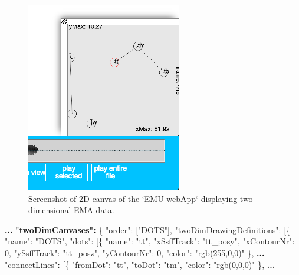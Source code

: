 \documentclass[]{book}
\newenvironment{Shaded}{\begin{snugshade}}{\end{snugshade}}
\newcommand{\DataTypeTok}[1]{\textcolor[rgb]{0.13,0.29,0.53}{#1}}
\newcommand{\DecValTok}[1]{\textcolor[rgb]{0.00,0.00,0.81}{#1}}
\newcommand{\ErrorTok}[1]{\textcolor[rgb]{0.64,0.00,0.00}{\textbf{#1}}}
\newcommand{\FunctionTok}[1]{\textcolor[rgb]{0.00,0.00,0.00}{#1}}
\newcommand{\OtherTok}[1]{\textcolor[rgb]{0.56,0.35,0.01}{#1}}
\newcommand{\StringTok}[1]{\textcolor[rgb]{0.31,0.60,0.02}{#1}}
\theoremstyle{definition}
\theoremstyle{definition}
\theoremstyle{definition}
\theoremstyle{remark}
\begin{document}
\begin{figure}

{\centering \includegraphics[width=0.35\linewidth]{pics/emu-webApp2dCanvas} 

}

\caption{Screenshot of 2D canvas of the `EMU-webApp` displaying two-dimensional EMA data.}\label{fig:webApp-2dCanvas}
\end{figure}

\begin{Shaded}
\begin{Highlighting}[]
\ErrorTok{...}
\ErrorTok{"twoDimCanvases":} \FunctionTok{\{}
    \DataTypeTok{"order"}\FunctionTok{:} \OtherTok{[}\StringTok{"DOTS"}\OtherTok{]}\FunctionTok{,}
    \DataTypeTok{"twoDimDrawingDefinitions"}\FunctionTok{:} \OtherTok{[}\FunctionTok{\{}
        \DataTypeTok{"name"}\FunctionTok{:} \StringTok{"DOTS"}\FunctionTok{,}
        \DataTypeTok{"dots"}\FunctionTok{:} \OtherTok{[}\FunctionTok{\{}
            \DataTypeTok{"name"}\FunctionTok{:} \StringTok{"tt"}\FunctionTok{,}
            \DataTypeTok{"xSsffTrack"}\FunctionTok{:} \StringTok{"tt_posy"}\FunctionTok{,}
            \DataTypeTok{"xContourNr"}\FunctionTok{:} \DecValTok{0}\FunctionTok{,}
            \DataTypeTok{"ySsffTrack"}\FunctionTok{:} \StringTok{"tt_posz"}\FunctionTok{,}
            \DataTypeTok{"yContourNr"}\FunctionTok{:} \DecValTok{0}\FunctionTok{,}
            \DataTypeTok{"color"}\FunctionTok{:} \StringTok{"rgb(255,0,0)"}
        \FunctionTok{\}}\OtherTok{,}
\ErrorTok{...}
    \StringTok{"connectLines"}\ErrorTok{:} \OtherTok{[}\FunctionTok{\{}
        \DataTypeTok{"fromDot"}\FunctionTok{:} \StringTok{"tt"}\FunctionTok{,}
        \DataTypeTok{"toDot"}\FunctionTok{:} \StringTok{"tm"}\FunctionTok{,}
            \DataTypeTok{"color"}\FunctionTok{:} \StringTok{"rgb(0,0,0)"}
    \FunctionTok{\}}\OtherTok{,}
\ErrorTok{...}
\end{Highlighting}
\end{Shaded}
\end{document}
